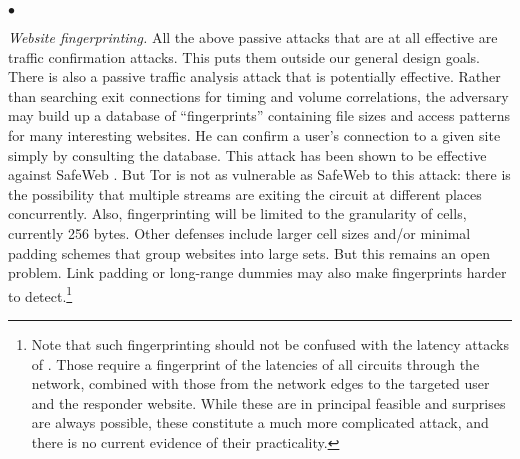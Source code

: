 \documentclass[times,10pt,twocolumn]{article}
\newenvironment{tightlist}{\begin{list}{$\bullet$}{
  \setlength{\itemsep}{0mm}
    \setlength{\parsep}{0mm}
    }}{\end{list}}
\begin{document}
\begin{tightlist}
\item \emph{Website fingerprinting.} All the above passive
  attacks that are at all effective are traffic confirmation attacks.
  This puts them outside our general design goals. There is also
  a passive traffic analysis attack that is potentially effective.
  Rather than searching exit connections for timing and volume
  correlations, the adversary may build up a database of
  ``fingerprints'' containing file sizes and access patterns for many
  interesting websites. He can confirm a user's connection to a given
  site simply by consulting the database. This attack has
  been shown to be effective against SafeWeb \cite{hintz-pet02}. But
  Tor is not as vulnerable as SafeWeb to this attack: there is the
  possibility that multiple streams are exiting the circuit at
  different places concurrently.  Also, fingerprinting will be limited to
  the granularity of cells, currently 256 bytes. Other defenses include
  larger cell sizes and/or minimal padding schemes that group websites
  into large sets. But this remains an open problem.  Link
  padding or long-range dummies may also make fingerprints harder to
  detect.\footnote{Note that
  such fingerprinting should not be confused with the latency attacks
  of \cite{back01}. Those require a fingerprint of the latencies of
  all circuits through the network, combined with those from the
  network edges to the targeted user and the responder website. While
  these are in principal feasible and surprises are always possible,
  these constitute a much more complicated attack, and there is no
  current evidence of their practicality.}


\end{tightlist}
\end{document}
